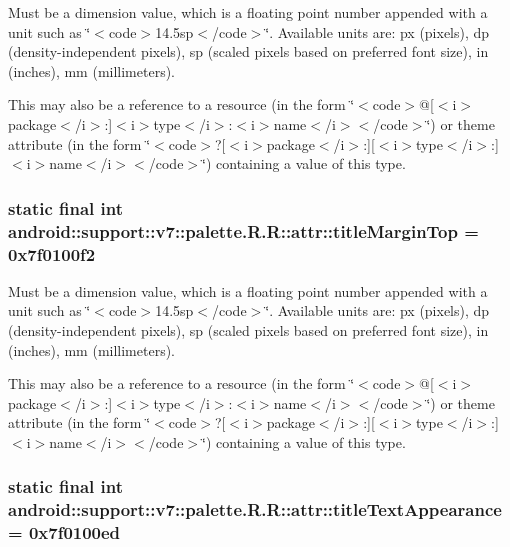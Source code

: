 Must be a dimension value, which is a floating point number appended with a unit such as \char`\"{}$<$code$>$14.5sp$<$/code$>$\char`\"{}. Available units are: px (pixels), dp (density-independent pixels), sp (scaled pixels based on preferred font size), in (inches), mm (millimeters). 

This may also be a reference to a resource (in the form \char`\"{}$<$code$>$@\mbox{[}$<$i$>$package$<$/i$>$:\mbox{]}$<$i$>$type$<$/i$>$:$<$i$>$name$<$/i$>$$<$/code$>$\char`\"{}) or theme attribute (in the form \char`\"{}$<$code$>$?\mbox{[}$<$i$>$package$<$/i$>$:\mbox{]}\mbox{[}$<$i$>$type$<$/i$>$:\mbox{]}$<$i$>$name$<$/i$>$$<$/code$>$\char`\"{}) containing a value of this type. \hypertarget{classandroid_1_1support_1_1v7_1_1palette_1_1_r_1_1attr_417174c3bf18c117ed59c9a06e31cb2d}{
\subsubsection[{titleMarginTop}]{\setlength{\rightskip}{0pt plus 5cm}static final int android::support::v7::palette.R.R::attr::titleMarginTop = 0x7f0100f2}}
\label{classandroid_1_1support_1_1v7_1_1palette_1_1_r_1_1attr_417174c3bf18c117ed59c9a06e31cb2d}


Must be a dimension value, which is a floating point number appended with a unit such as \char`\"{}$<$code$>$14.5sp$<$/code$>$\char`\"{}. Available units are: px (pixels), dp (density-independent pixels), sp (scaled pixels based on preferred font size), in (inches), mm (millimeters). 

This may also be a reference to a resource (in the form \char`\"{}$<$code$>$@\mbox{[}$<$i$>$package$<$/i$>$:\mbox{]}$<$i$>$type$<$/i$>$:$<$i$>$name$<$/i$>$$<$/code$>$\char`\"{}) or theme attribute (in the form \char`\"{}$<$code$>$?\mbox{[}$<$i$>$package$<$/i$>$:\mbox{]}\mbox{[}$<$i$>$type$<$/i$>$:\mbox{]}$<$i$>$name$<$/i$>$$<$/code$>$\char`\"{}) containing a value of this type. \hypertarget{classandroid_1_1support_1_1v7_1_1palette_1_1_r_1_1attr_7d5c437fe6990cd124d231fceb339407}{
\subsubsection[{titleTextAppearance}]{\setlength{\rightskip}{0pt plus 5cm}static final int android::support::v7::palette.R.R::attr::titleTextAppearance = 0x7f0100ed}}
\label{classandroid_1_1support_1_1v7_1_1palette_1_1_r_1_1attr_7d5c437fe6990cd124d231fceb339407}


